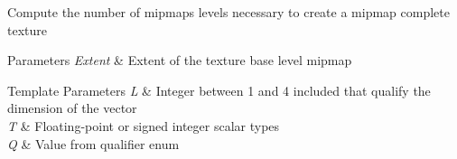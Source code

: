 Compute the number of mipmaps levels necessary to create a mipmap complete texture


\begin{DoxyParams}{Parameters}
{\em Extent} & Extent of the texture base level mipmap \\
\hline
\end{DoxyParams}

\begin{DoxyTemplParams}{Template Parameters}
{\em L} & Integer between 1 and 4 included that qualify the dimension of the vector \\
\hline
{\em T} & Floating-\/point or signed integer scalar types \\
\hline
{\em Q} & Value from qualifier enum \\
\hline
\end{DoxyTemplParams}
